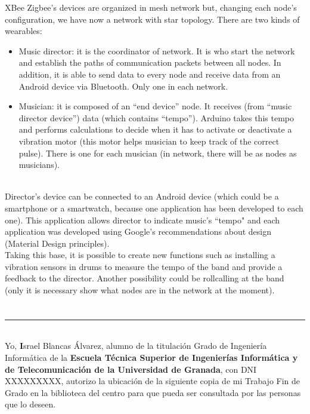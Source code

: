 XBee Zigbee’s devices are organized in mesh network but, changing each node’s configuration, we have now a network with
star topology. There are two kinds of wearables:
  \begin{itemize}
  \item Music director: it is the coordinator of network. It is who start the network and establish the paths of communication packets between all nodes. In addition, it is able to send data to every node and receive data from an Android device via Bluetooth. Only one in each network.
  \item Musician: it is composed of an “end device” node. It receives (from “music director device”) data (which contains “tempo”). Arduino takes this tempo and performs calculations to decide when it has to activate or deactivate a vibration motor (this motor helps musician to keep track of the correct pulse). There is one for each musician (in network, there will be as nodes as musicians).
  \end{itemize}

\\
Director’s device can be connected to an Android device (which could be a smartphone or a smartwatch,
because one application has been developed to each one). This application allows director to indicate music’s
``tempo" and each application was developed using Google’s recommendations about design (Material Design principles).\\

Taking this base, it is possible to create new functions such as installing a vibration sensors in drums to measure the
tempo of the band and provide a feedback to the director. Another possibility could be rollcalling at the band (only it
is necessary show what nodes are in the network at the moment).\\


\chapter*{}
\thispagestyle{empty}

\noindent\rule[-1ex]{\textwidth}{2pt}\\[4.5ex]

Yo, \textbf Israel Blancas Álvarez, alumno de la titulación Grado de Ingeniería Informática de la \textbf{Escuela Técnica Superior
de Ingenierías Informática y de Telecomunicación de la Universidad de Granada}, con DNI XXXXXXXXX, autorizo la
ubicación de la siguiente copia de mi Trabajo Fin de Grado en la biblioteca del centro para que pueda ser
consultada por las personas que lo deseen.

